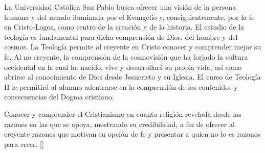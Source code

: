 \begin{syllabus}


\begin{justification}
La Universidad Católica San Pablo busca ofrecer una visión de la persona humana y del mundo iluminada por el Evangelio y, consiguientemente, por la fe en Cristo-Logos, como centro de la creación y de la historia. El estudio de la teología es fundamental para dicha comprensión de Dios, del hombre y del cosmos.
La Teología permite al creyente en Cristo conocer y comprender mejor su fe. Al no creyente, la comprensión de la cosmovisión que ha forjado la cultura occidental en la cual ha nacido, vive y desarrollará su propia vida, así­ como abrirse al conocimiento de Dios desde Jesucristo y su Iglesia.
El curso de Teología II le permitirá al alumno  adentrarse en la comprensión de los contenidos y consecuencias del Dogma cristiano.
\end{justification}

\begin{goals}
\item Conocer y comprender el Cristianismo en cuanto religión revelada desde las razones en las que se apoya, mostrando su credibilidad, a fin de ofrecer al creyente razones que motivan su opción de fe y presentar a quien no lo es razones para creer. [\Usage]
\end{goals}

\begin{outcomes}
    \item {}
    \item {}
    \item {}
\end{outcomes}

\begin{competences}
    \item {}
    \item {}
    \item {}
    \item {}
    \item {}
\end{competences}


\end{syllabus}
